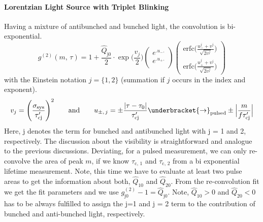 \paragraph{Lorentzian Light Source with Triplet Blinking} Having a mixture of antibunched and bunched light, the convolution is bi-exponential.
\begin{equation}\label{eq:ConvImpBlink}
	g^{(2)}(m,\,\tau)=1+\dfrac{\hat{Q}_\mathrm{j0}}{2} \cdot \exp{\Big(\dfrac{v_j}{2}\Big)}
	\left(\begin{array}{c}
		e^{\big.u_{-}\big.} \\
		e^{\big.u_{+}\big.}\\
	\end{array}\right)
\left(\begin{array}{c}
		\text{erfc}\big(\frac{u_{-}^j+v^j}{\sqrt{2v^j}}\big) \\
		\text{erfc}\big(\frac{u_{+}^j+v^j}{\sqrt{2v^j}}\big)
	\end{array}\right)
\end{equation}
with the Einstein notation $j=\{1,2\}$ (summation if $j$ occurs in the index and exponent).
\begin{equation}\label{eq:ConvImpBlinkCond}
	v_j=\Bigg(\dfrac{\sigma_\mathrm{sys}}{\tau'_\mathrm{cj}}\Bigg)^2\qquad \text{and}\qquad u_{\pm,\, j}=\pm \dfrac{|\tau -\tau_0|}{\tau'_\mathrm{cj}}\underbracket{\rightarrow}_\mathrm{pulsed}\pm\Big|\dfrac{m}{f\tau'_\mathrm{cj}}\Big|\\
\end{equation}
Here, j denotes the term for bunched and antibunched light with j = \num{1} and \num{2}, respectively. The discussion about the visibility is straightforward and analogue to the previous discussions.
Deviating, for a pulsed measurement, we can only re-convolve the area of peak $m$, if we know $\tau_\mathrm{c,\,1}$ and $\tau_\mathrm{c,\,2}$ from a bi exponential lifetime measurement. Note, this time we have to evaluate at least two pulse areas to get the information about both, $\hat{Q}_\mathrm{10}$ and $\hat{Q}_\mathrm{20}$.
From the re-convolution fit we get the fit parameters and we use $g^{(2)}_\mathrm{j0}-1=\hat{Q}_\mathrm{j0}$. Note, $\hat{Q}_{10}>0$ and $\hat{Q}_{20}<0$ has to be always fulfilled to assign the j=\num{1} and j = \num{2} term to the contribution of bunched and anti-bunched light, respectively.\\

